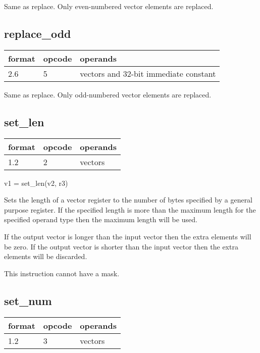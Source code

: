 \documentclass[forwardcom.tex]{subfiles}
\begin{document}
Same as replace. Only even-numbered vector elements are replaced.
\vv

\subsection{replace\_odd}
\label{table:replaceOddInstruction}
\begin{tabular}{|p{12mm}|p{15mm}|p{100mm}|}
\hline
\bfseries format & \bfseries opcode & \bfseries operands \\ \hline
2.6 & 5 & vectors and 32-bit immediate constant \\ \hline
\end{tabular}
\vv

Same as replace. Only odd-numbered vector elements are replaced.
\vv

\subsection{set\_len}
\label{table:setLenInstruction}
\begin{tabular}{|p{12mm}|p{15mm}|p{100mm}|}
\hline
\bfseries format & \bfseries opcode & \bfseries operands \\ \hline
1.2 & 2 & vectors \\ \hline
\end{tabular}
\vv

v1 = set\_len(v2, r3)
\vv

Sets the length of a vector register to the number of bytes specified by a general purpose register. If the specified length is more than the maximum length for the specified operand type then the maximum length will be used.
\vv

If the output vector is longer than the input vector then the extra elements will be zero. If the output vector is shorter than the input vector then the extra elements will be discarded. 
\vv

This instruction cannot have a mask.
\vv

\subsection{set\_num}
\label{table:setNumInstruction}
\begin{tabular}{|p{12mm}|p{15mm}|p{100mm}|}
\hline
\bfseries format & \bfseries opcode & \bfseries operands \\ \hline
1.2 & 3 & vectors \\ \hline
\end{tabular}
\vv
\end{document}
